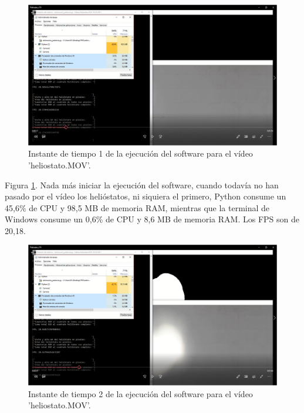 \begin{figure}[h!]
  	\centering
	\includegraphics[width=\textwidth]{CapturasRendimientoSoftware2/Imagen1.png}
	\caption{Instante de tiempo 1 de la ejecución del software para el vídeo 'heliostato.MOV'.
	\label{fig:CapturasRendimientoSoftware2/Imagen1.png}}
\end{figure}

Figura \ref{fig:CapturasRendimientoSoftware2/Imagen1.png}. Nada más iniciar la ejecución del software, cuando todavía no han pasado por el vídeo los helióstatos, ni siquiera el primero, Python consume un 45,6\% de CPU y 98,5 MB de memoria RAM, mientras que la terminal de Windows consume un 0,6\% de CPU y 8,6 MB de memoria RAM. Los FPS son de 20,18.

\begin{figure}[h!]
  	\centering
	\includegraphics[width=\textwidth]{CapturasRendimientoSoftware2/Imagen2.png}
	\caption{Instante de tiempo 2 de la ejecución del software para el vídeo 'heliostato.MOV'.
	\label{fig:CapturasRendimientoSoftware2/Imagen2.png}}
\end{figure}

